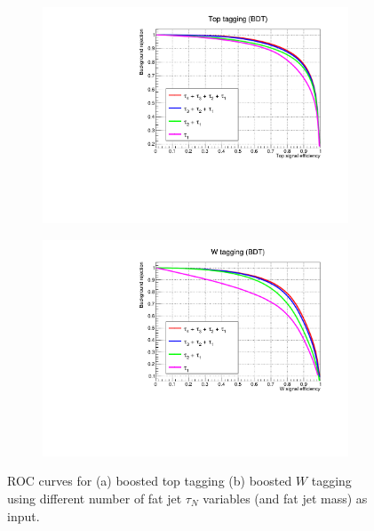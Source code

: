 \documentclass[main]{subfiles} %
\begin{document}
\begin{figure}[h]
     \centering
     \begin{subfigure}[h]{0.49\textwidth}
         \centering
         \includegraphics[width=\textwidth]{../Figures/Results/multibody/top_multibody.pdf}
          \caption{}
         \label{fig:top_multibody}
     \end{subfigure}
     \begin{subfigure}[h]{0.49\textwidth}
         \centering
         \includegraphics[width=\textwidth]{../Figures/Results/multibody/W_multibody.pdf}
          \caption{}
         \label{fig:W_multibody}
     \end{subfigure}
     \caption{ROC curves for (a) boosted top tagging (b) boosted $W$ tagging using different number of fat jet $\tau_N$ variables (and fat jet mass) as input.}
     \label{fig:ROC_multibody}
\end{figure}
\end{document}
